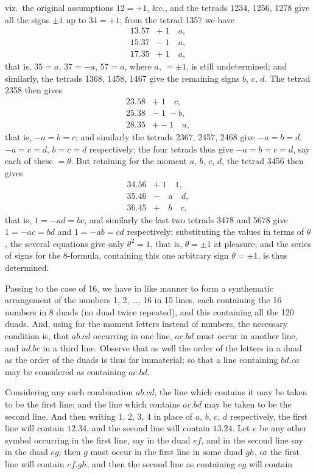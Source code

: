 \documentclass[11pt,a4paper]{book}
\begin{document}
\newpage
viz.\ the original assumptions $12 = +1$, \&c., and the tetrads 1234, 1256, 1278 give all the signs $\pm 1$ up to $34 = +1$; from the tetrad 1357 we have
\begin{align*}
13.57 &+ \; 1 \quad a, \\
15.37 &- \; 1 \quad a, \\
17.35 &+ \; 1 \quad a,
\end{align*}
that is, $35 = a$, $37 = -a$, $57 = a$, where $a$, $= \pm 1$, is still undetermined; and similarly, the tetrads 1368, 1458, 1467 give the remaining signs $b$, $c$, $d$. The tetrad 2358 then gives
\begin{align*}
23.58 &+ \; 1 \quad c, \\
25.38 &- \; 1 \; -b, \\
28.35 &+ -1 \quad a,
\end{align*}
that is, $-a = b = c$; and similarly the tetrads 2367, 2457, 2468 give $-a = b = d$, $-a = c = d$, $b = c = d$ respectively; the four tetrads thus give $-a = b = c = d$, say each of these $= \theta$. But retaining for the moment $a$, $b$, $c$, $d$, the tetrad 3456 then gives
\begin{align*}
34.56 &+ \; 1 \quad 1, \\
35.46 &- \quad a \quad d, \\
36.45 &+ \quad b \quad c,
\end{align*}
that is, $1 = -ad = bc$, and similarly the last two tetrads 3478 and 5678 give $1 = -ac = bd$ and $1 = -ab = cd$ respectively; substituting the values in terms of $\theta$, the several equations give only $\theta^2 = 1$, that is, $\theta = \pm 1$ at pleasure; and the series of signs for the 8-formula, containing this one arbitrary sign $\theta = \pm 1$, is thus determined.

Passing to the case of 16, we have in like manner to form a synthematic arrangement of the numbers 1, 2, \ldots, 16 in 15 lines, each containing the 16 numbers in 8 duads (no duad twice repeated), and this containing all the 120 duads. And, using for the moment letters instead of numbers, the necessary condition is, that $ab.cd$ occurring in one line, $ac.bd$ must occur in another line, and $ad.bc$ in a third line. Observe that as well the order of the letters in a duad as the order of the duads is thus far immaterial; so that a line containing $bd.ca$ may be considered as containing $ac.bd$.

Considering any such combination $ab.cd$, the line which contains it may be taken to be the first line; and the line which contains $ac.bd$ may be taken to be the second line. And then writing 1, 2, 3, 4 in place of $a$, $b$, $c$, $d$ respectively, the first line will contain $12.34$, and the second line will contain $13.24$. Let $e$ be any other symbol occurring in the first line, say in the duad $ef$, and in the second line say in the duad $eg$; then $g$ must occur in the first line in some duad $gh$, or the first line will contain $ef.gh$, and then the second line as containing $eg$ will contain
\end{document}
